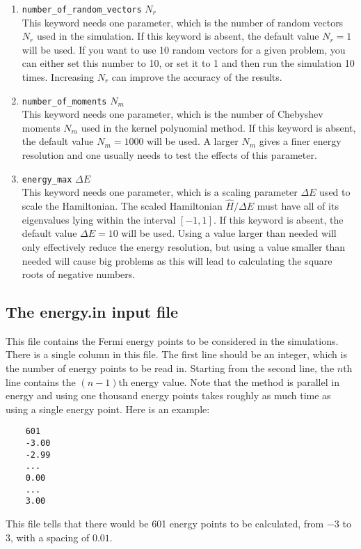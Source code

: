 \documentclass[12pt,a4paper]{report}
\begin{document}
\begin{enumerate}
\item \verb"number_of_random_vectors" $N_r$\\
This keyword needs one parameter, which is the number of random vectors $N_r$ used in the simulation. If this keyword is absent, the default value $N_r=1$ will be used. If you want to use 10 random vectors for a given problem, you can either set this number to 10, or set it to 1 and then run the simulation 10 times. Increasing $N_r$ can improve the accuracy of the results.
\item \verb"number_of_moments" $N_m$\\
This keyword needs one parameter, which is the number of Chebyshev moments $N_m$ used in the kernel polynomial method. If this keyword is absent, the default value $N_m=1000$ will be used. A larger $N_m$ gives a finer energy resolution and one usually needs to test the effects of this parameter.
\item \verb"energy_max" $\Delta E$ \\
This keyword needs one parameter, which is a scaling parameter $\Delta E$ used to scale the Hamiltonian. The scaled Hamiltonian $\hat{H}/\Delta E$ must have all of its eigenvalues lying within the interval $[-1, 1]$. If this keyword is absent, the default value $\Delta E =10$ will be used. Using a value larger than needed will only effectively reduce the energy resolution, but using a value smaller than needed will cause big problems as this will lead to calculating the square roots of negative numbers.
\end{enumerate}

\subsection{The energy.in input file}

This file contains the Fermi energy points to be considered in the simulations. There is a single column in this file. The first line should be an integer, which is the number of energy points to be read in. Starting from the second line, the $n$th line contains the $(n-1)$th energy value. Note that the method is parallel in energy and using one thousand energy points takes roughly as much time as using a single energy point. 
Here is an example:
\begin{verbatim}
    601
    -3.00
    -2.99
    ...
    0.00
    ...
    3.00
\end{verbatim}
This file tells that there would be 601 energy points to be calculated, from $-3$ to $3$, with a spacing of $0.01$. 
\end{document}
